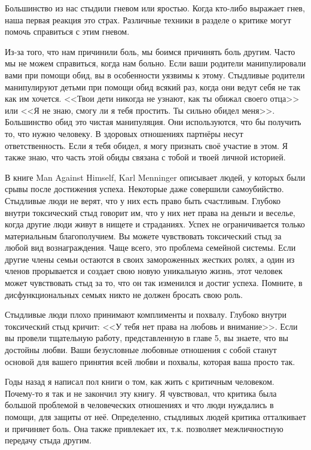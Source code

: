 \documentclass[10pt, fleqn]{article}
\begin{document}
Большинство из нас стыдили гневом или яростью. Когда кто-либо выражает гнев, наша первая реакция это страх. Различные техники в разделе о критике могут помочь справиться с этим гневом.


Из-за того, что нам причинили боль, мы боимся причинять боль другим. Часто мы не можем справиться, когда нам больно. Если ваши родители манипулировали вами при помощи обид, вы в особенности уязвимы к этому. Стыдливые родители манипулируют детьми при помощи обид всякий раз, когда они ведут себя не так как им хочется. <<Твои дети никогда не узнают, как ты обижал своего отца>> или <<Я не знаю, смогу ли я тебя простить. Ты сильно обидел меня>>. Большинство обид это чистая манипуляция. Они используются, что бы получить то, что нужно человеку. В здоровых отношениях партнёры несут ответственность. Если я тебя обидел, я могу признать своё участие в этом. Я также знаю, что часть этой обиды связана с тобой и твоей личной историей.



В книге Man Against Himself, Karl Menninger описывает людей, у которых были срывы после достижения успеха. Некоторые даже совершили самоубийство. Стыдливые люди не верят, что у них есть право быть счастливым. Глубоко внутри токсический стыд говорит им, что у них нет права на деньги и веселье, когда другие люди живут в нищете и страданиях. Успех не ограничивается только материальным благополучием. Вы можете чувствовать токсический стыд за любой вид вознаграждения. Чаще всего, это проблема семейной системы. Если другие члены семьи остаются в своих замороженных жестких ролях, а один из членов прорывается и создает свою новую уникальную жизнь, этот человек может чувствовать стыд за то, что он так изменился и достиг успеха. Помните, в дисфункциональных семьях никто не должен бросать свою роль.


Стыдливые люди плохо принимают комплименты и похвалу. Глубоко внутри токсический стыд кричит: <<У тебя нет права на любовь и внимание>>. Если вы провели тщательную работу, представленную в главе 5, вы знаете, что вы достойны любви. Ваши безусловные любовные отношения с собой станут основой для вашего принятия всей любви и похвалы, которая ваша просто так.


Годы назад я написал пол книги о том, как жить с критичным человеком. Почему-то я так и не закончил эту книгу. Я чувствовал, что критика была большой проблемой в человеческих отношениях и что люди нуждались в помощи, для защиты от неё. Определенно, стыдливых людей критика отталкивает и причиняет боль. Она также привлекает их, т.к. позволяет межличностную передачу стыда другим.
\end{document}
